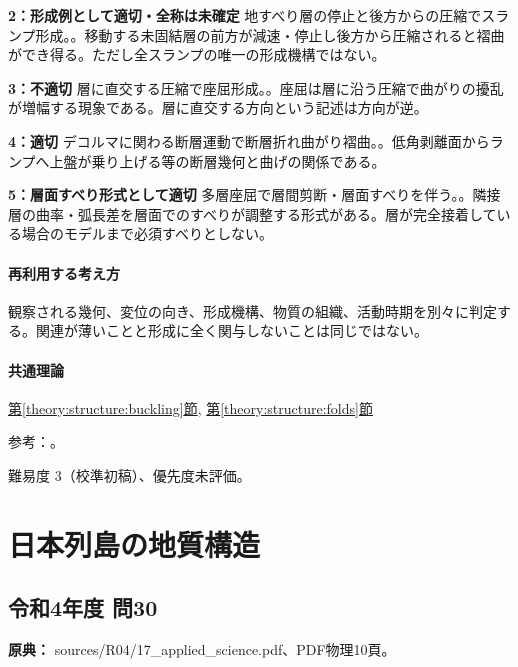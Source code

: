\noindent\textbf{2：形成例として適切・全称は未確定} 地すべり層の停止と後方からの圧縮でスランプ形成。。移動する未固結層の前方が減速・停止し後方から圧縮されると褶曲ができ得る。ただし全スランプの唯一の形成機構ではない。\par

\noindent\textbf{3：不適切} 層に直交する圧縮で座屈形成。。座屈は層に沿う圧縮で曲がりの擾乱が増幅する現象である。層に直交する方向という記述は方向が逆。\par

\noindent\textbf{4：適切} デコルマに関わる断層運動で断層折れ曲がり褶曲。。低角剥離面からランプへ上盤が乗り上げる等の断層幾何と曲げの関係である。\par

\noindent\textbf{5：層面すべり形式として適切} 多層座屈で層間剪断・層面すべりを伴う。。隣接層の曲率・弧長差を層面でのすべりが調整する形式がある。層が完全接着している場合のモデルまで必須すべりとしない。\par

\paragraph{再利用する考え方} 観察される幾何、変位の向き、形成機構、物質の組織、活動時期を別々に判定する。関連が薄いことと形成に全く関与しないことは同じではない。

\paragraph{共通理論} \hyperref[theory:structure:buckling]{第\ref*{theory:structure:buckling}節}, \hyperref[theory:structure:folds]{第\ref*{theory:structure:folds}節}

\par 参考：\cite{str_fold}。

\par 難易度 3（校準初稿）、優先度未評価。

\section{日本列島の地質構造}

\subsection{令和4年度 問30}
\label{q:r04-reg-applied-30}

\noindent\textbf{原典：} sources/R04/17\_applied\_science.pdf、PDF物理10頁。

